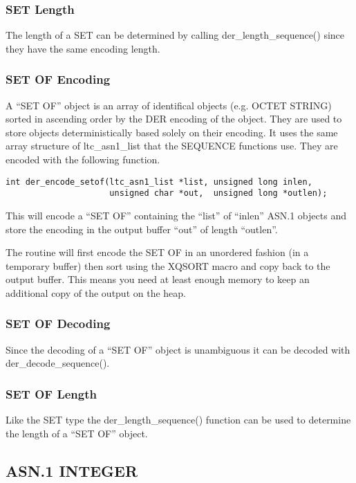 \documentclass[a4paper]{book}
\begin{document}
\subsubsection{SET Length}
The length of a SET can be determined by calling der\_length\_sequence() since they have the same encoding length.

\subsubsection{SET OF Encoding}
A ``SET OF'' object is an array of identifical objects (e.g. OCTET STRING) sorted in ascending order by the DER encoding of the object.  They are 
used to store objects deterministically based solely on their encoding.  It uses the same array structure of ltc\_asn1\_list that the SEQUENCE functions
use.  They are encoded with the following function.

\begin{verbatim}
int der_encode_setof(ltc_asn1_list *list, unsigned long inlen,
                     unsigned char *out,  unsigned long *outlen);
\end{verbatim}

This will encode a ``SET OF'' containing the ``list'' of ``inlen'' ASN.1 objects and store the encoding in the output buffer ``out'' of length ``outlen''.

The routine will first encode the SET OF in an unordered fashion (in a temporary buffer) then sort using the XQSORT macro and copy back to the output buffer.  This
means you need at least enough memory to keep an additional copy of the output on the heap.  

\subsubsection{SET OF Decoding}
Since the decoding of a ``SET OF'' object is unambiguous it can be decoded with der\_decode\_sequence().  

\subsubsection{SET OF Length}
Like the SET type the der\_length\_sequence() function can be used to determine the length of a ``SET OF'' object.

\subsection{ASN.1 INTEGER}
\end{document}
